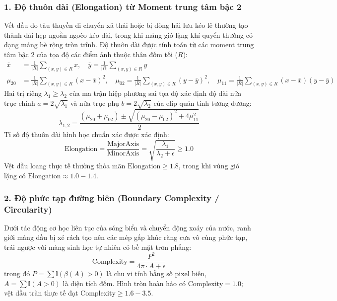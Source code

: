 \subsubsection{1. Độ thuôn dài (Elongation) từ Moment trung tâm bậc 2}
Vết dầu do tàu thuyền di chuyển xả thải hoặc bị dòng hải lưu kéo lê thường tạo thành dải hẹp ngoằn ngoèo kéo dài, trong khi mảng gió lặng khí quyển thường có dạng mảng bè rộng tròn trĩnh. Độ thuôn dài được tính toán từ các moment trung tâm bậc 2 của tọa độ các điểm ảnh thuộc thân đốm tối ($R$):
\begin{align}
    \bar{x} &= \frac{1}{|R|} \sum_{(x,y) \in R} x, \quad \bar{y} = \frac{1}{|R|} \sum_{(x,y) \in R} y \\
    \mu_{20} &= \frac{1}{|R|} \sum_{(x,y) \in R} (x - \bar{x})^2, \quad \mu_{02} = \frac{1}{|R|} \sum_{(x,y) \in R} (y - \bar{y})^2, \quad \mu_{11} = \frac{1}{|R|} \sum_{(x,y) \in R} (x - \bar{x})(y - \bar{y})
\end{align}
Hai trị riêng $\lambda_1 \ge \lambda_2$ của ma trận hiệp phương sai tọa độ xác định độ dài nửa trục chính $a = 2\sqrt{\lambda_1}$ và nửa trục phụ $b = 2\sqrt{\lambda_2}$ của elip quán tính tương đương:
\begin{equation}
    \lambda_{1, 2} = \frac{(\mu_{20} + \mu_{02}) \pm \sqrt{(\mu_{20} - \mu_{02})^2 + 4\mu_{11}^2}}{2}
\end{equation}
Tỉ số độ thuôn dài hình học chuẩn xác được xác định:
\begin{equation}
    \text{Elongation} = \frac{\text{MajorAxis}}{\text{MinorAxis}} = \sqrt{\frac{\lambda_1}{\lambda_2 + \epsilon}} \ge 1.0
\end{equation}
Vệt dầu loang thực tế thường thỏa mãn $\text{Elongation} \ge 1.8$, trong khi vùng gió lặng có $\text{Elongation} \approx 1.0 - 1.4$.

\subsubsection{2. Độ phức tạp đường biên (Boundary Complexity / Circularity)}
Dưới tác động cơ học liên tục của sóng biển và chuyển động xoáy của nước, ranh giới màng dầu bị xé rách tạo nên các mép gấp khúc răng cưa vô cùng phức tạp, trái ngược với màng sinh học tự nhiên có bề mặt trơn phẳng:
\begin{equation}
    \text{Complexity} = \frac{P^2}{4\pi \cdot A + \epsilon}
\end{equation}
trong đó $P = \sum \mathbb{I}(\beta(A) > 0)$ là chu vi tính bằng số pixel biên, $A = \sum \mathbb{I}(A > 0)$ là diện tích đốm. Hình tròn hoàn hảo có $\text{Complexity} = 1.0$; vệt dầu tràn thực tế đạt $\text{Complexity} \ge 1.6 - 3.5$.

